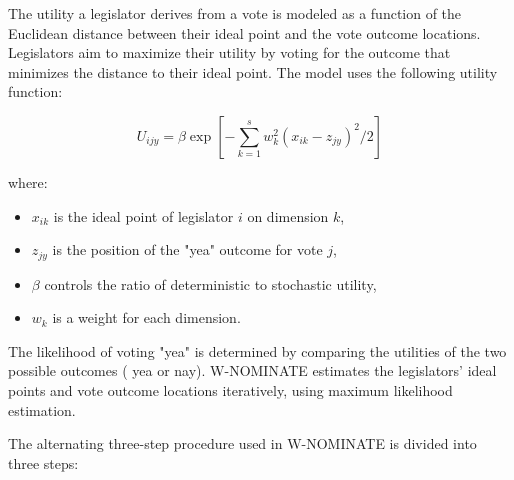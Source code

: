 \documentclass[a4paper,12pt]{report}
\begin{document}
                The utility a legislator derives from a vote is modeled as a function of the Euclidean distance between
                their ideal point and the vote outcome locations. Legislators aim to maximize their utility by voting
                for the outcome that minimizes the distance to their ideal point. The model uses the following utility
                function:

                \[
                    U_{ijy} = \beta \exp \left[ -\sum_{k=1}^{s} w_k^2 (x_{ik} - z_{jy})^2 / 2 \right]
                \]

                where:
                \begin{itemize}
                    \item \( x_{ik} \) is the ideal point of legislator \(i\) on dimension \(k\),
                    \item \( z_{jy} \) is the position of the "yea" outcome for vote \(j\),
                    \item \( \beta \) controls the ratio of deterministic to stochastic utility,
                    \item \( w_k \) is a weight for each dimension.
                \end{itemize}

                The likelihood of voting "yea" is determined by comparing the utilities of the two possible outcomes (
                yea or nay). W-NOMINATE estimates the legislators' ideal points and vote outcome locations iteratively,
                using maximum likelihood estimation.

                The alternating three-step procedure used in W-NOMINATE is divided into three steps:
\end{document}
